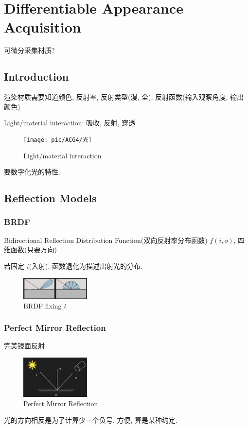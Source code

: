 \newpage
\section{Differentiable Appearance Acquisition}
可微分采集材质?

\subsection{Introduction}

渲染材质需要知道颜色, 反射率, 反射类型(漫, 全), 反射函数(输入观察角度, 输出颜色)

Light/material interaction: 吸收, 反射, 穿透

\begin{figure}[!htb]
    \centering
    \texttt{[image: pic/ACG4/光]}
    \caption{Light/material interaction}
\end{figure}

要数字化光的特性. 

\subsection{Reflection Models}
\subsubsection{BRDF}
Bidirectional Reflection Distribution Function(双向反射率分布函数) $f(i,o)$, 四维函数(只要方向)

若固定 $i$(入射), 函数退化为描述出射光的分布. 
\begin{figure}[!htb]
    \centering
    \includegraphics[width=0.309\textwidth]{pic/ACG4/BRDFfi.png}
    \caption{BRDF fixing $i$}
\end{figure}


\subsubsection{Perfect Mirror Reflection}
完美镜面反射
\begin{figure}[!htb]
    \centering
    \includegraphics[width=0.309\textwidth]{pic/ACG4/Perfect Mirror Reflection}
    \caption{Perfect Mirror Reflection}
\end{figure}
光的方向相反是为了计算少一个负号, 方便, 算是某种约定. 

